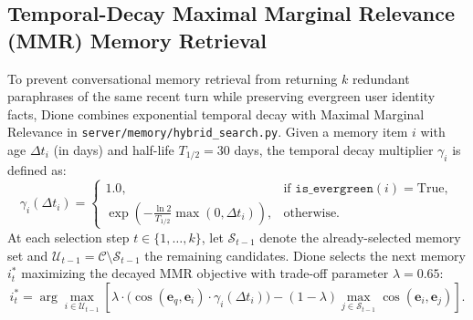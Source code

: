 \documentclass[10pt,a4paper]{article}
\begin{document}
\subsection{Temporal-Decay Maximal Marginal Relevance (MMR) Memory Retrieval}
To prevent conversational memory retrieval from returning $k$ redundant paraphrases of the same recent turn while preserving evergreen user identity facts, Dione combines exponential temporal decay with Maximal Marginal Relevance \cite{carbonell1998mmr} in \texttt{server/memory/hybrid\_search.py}. Given a memory item $i$ with age $\Delta t_i$ (in days) and half-life $T_{1/2} = 30$ days, the temporal decay multiplier $\gamma_i$ is defined as:
\begin{equation}
\gamma_i(\Delta t_i) = \begin{cases}
1.0, & \text{if } \texttt{is\_evergreen}(i) = \text{True}, \\
\exp\!\left(-\frac{\ln 2}{T_{1/2}} \max(0, \Delta t_i)\right), & \text{otherwise.}
\end{cases}
\end{equation}
At each selection step $t \in \{1, \dots, k\}$, let $\mathcal{S}_{t-1}$ denote the already-selected memory set and $\mathcal{U}_{t-1} = \mathcal{C} \setminus \mathcal{S}_{t-1}$ the remaining candidates. Dione selects the next memory $i_t^*$ maximizing the decayed MMR objective with trade-off parameter $\lambda = 0.65$:
\begin{equation}
i_t^* = \arg\max_{i \in \mathcal{U}_{t-1}} \left[ \lambda \cdot \big(\cos(\mathbf{e}_q, \mathbf{e}_i) \cdot \gamma_i(\Delta t_i)\big) - (1 - \lambda) \max_{j \in \mathcal{S}_{t-1}} \cos(\mathbf{e}_i, \mathbf{e}_j) \right].
\label{eq:mmr}
\end{equation}
\end{document}

